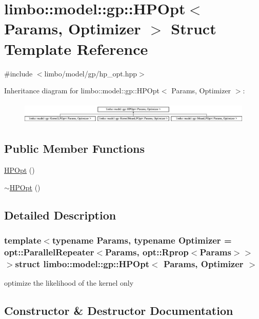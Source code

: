 \hypertarget{structlimbo_1_1model_1_1gp_1_1_h_p_opt}{}\section{limbo\+:\+:model\+:\+:gp\+:\+:H\+P\+Opt$<$ Params, Optimizer $>$ Struct Template Reference}
\label{structlimbo_1_1model_1_1gp_1_1_h_p_opt}


{\ttfamily \#include $<$limbo/model/gp/hp\+\_\+opt.\+hpp$>$}

Inheritance diagram for limbo\+:\+:model\+:\+:gp\+:\+:H\+P\+Opt$<$ Params, Optimizer $>$\+:\begin{figure}[H]
\begin{center}
\leavevmode
\includegraphics[height=1.078998cm]{structlimbo_1_1model_1_1gp_1_1_h_p_opt}
\end{center}
\end{figure}
\subsection*{Public Member Functions}
\begin{DoxyCompactItemize}
\item 
\hyperlink{structlimbo_1_1model_1_1gp_1_1_h_p_opt_a4db24a2480ea1e8600f41515ef9d30cd}{H\+P\+Opt} ()
\item 
\hyperlink{structlimbo_1_1model_1_1gp_1_1_h_p_opt_a9dc7a6a24a0dfccf45e4f88ddab8797d}{$\sim$\+H\+P\+Opt} ()
\end{DoxyCompactItemize}


\subsection{Detailed Description}
\subsubsection*{template$<$typename Params, typename Optimizer = opt\+::\+Parallel\+Repeater$<$\+Params, opt\+::\+Rprop$<$\+Params$>$$>$$>$struct limbo\+::model\+::gp\+::\+H\+P\+Opt$<$ Params, Optimizer $>$}

optimize the likelihood of the kernel only 

\subsection{Constructor \& Destructor Documentation}
\hypertarget{structlimbo_1_1model_1_1gp_1_1_h_p_opt_a4db24a2480ea1e8600f41515ef9d30cd}{}
